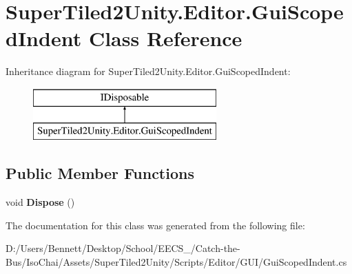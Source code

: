 \hypertarget{class_super_tiled2_unity_1_1_editor_1_1_gui_scoped_indent}{}\section{Super\+Tiled2\+Unity.\+Editor.\+Gui\+Scoped\+Indent Class Reference}
\label{class_super_tiled2_unity_1_1_editor_1_1_gui_scoped_indent}
Inheritance diagram for Super\+Tiled2\+Unity.\+Editor.\+Gui\+Scoped\+Indent\+:\begin{figure}[H]
\begin{center}
\leavevmode
\includegraphics[height=2.000000cm]{class_super_tiled2_unity_1_1_editor_1_1_gui_scoped_indent}
\end{center}
\end{figure}
\subsection*{Public Member Functions}
\begin{DoxyCompactItemize}
\item 
\mbox{\label{class_super_tiled2_unity_1_1_editor_1_1_gui_scoped_indent_a67c36f811fd636e9e1370457dc756651}} 
void {\bfseries Dispose} ()
\end{DoxyCompactItemize}


The documentation for this class was generated from the following file\+:\begin{DoxyCompactItemize}
\item 
D\+:/\+Users/\+Bennett/\+Desktop/\+School/\+E\+E\+C\+S\+\_/\+Catch-\/the-\/\+Bus/\+Iso\+Chai/\+Assets/\+Super\+Tiled2\+Unity/\+Scripts/\+Editor/\+G\+U\+I/Gui\+Scoped\+Indent.\+cs\end{DoxyCompactItemize}
